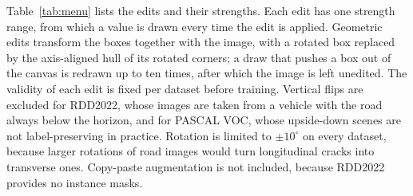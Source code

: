 Table~\ref{tab:menu} lists the edits and their strengths. Each edit has one strength range, from which a value is drawn every time the edit is applied. Geometric edits transform the boxes together with the image, with a rotated box replaced by the axis-aligned hull of its rotated corners; a draw that pushes a box out of the canvas is redrawn up to ten times, after which the image is left unedited. The validity of each edit is fixed per dataset before training. Vertical flips are excluded for RDD2022, whose images are taken from a vehicle with the road always below the horizon, and for PASCAL VOC, whose upside-down scenes are not label-preserving in practice. Rotation is limited to $\pm10^\circ$ on every dataset, because larger rotations of road images would turn longitudinal cracks into transverse ones. Copy-paste augmentation is not included, because RDD2022 provides no instance masks.

